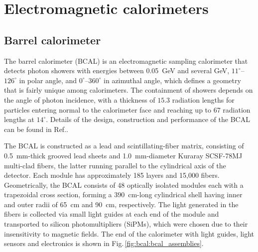 \section[Electromagnetic calorimeters] {Electromagnetic calorimeters \label{sec:calorimeters}}

\subsection[Barrel calorimeter ]{Barrel calorimeter \label{sec:bcal}}
The barrel calorimeter (BCAL) is an electromagnetic sampling calorimeter that detects photon showers with energies between 0.05~GeV and several GeV, $11^{\circ}$--$126^{\circ}$ in polar angle, and $0^{\circ}$--$360^{\circ}$ in azimuthal angle, which defines a geometry that is fairly unique among calorimeters. The containment of showers depends on the angle of photon incidence, with a thickness of $15.3$ radiation lengths for particles entering normal to the calorimeter face and reaching up to 67 radiation lengths at $14^{\circ}$. Details of the design, construction and performance of the BCAL can be found in Ref.\cite{BEATTIE201824}.

The BCAL is constructed as a lead and  scintillating-fiber matrix, consisting of 0.5~mm-thick grooved lead sheets and 1.0~mm-diameter Kuraray SCSF-78MJ multi-clad fibers, the latter running parallel to the cylindrical axis of the detector. Each module has approximately 185 layers and 15,000 fibers. Geometrically, the BCAL consists of 48 optically isolated modules each with a trapezoidal cross section, forming a  390~cm-long cylindrical shell having inner and outer radii of 65~cm and 90~cm, respectively. The light generated in the fibers is collected via small light guides at each end of the module and transported to silicon photomultipliers (SiPMs), which were chosen due to their insensitivity to magnetic fields. The end of the calorimeter with light guides, light sensors and electronics is shown in  Fig.\,\ref{fig:bcal:bcal_assemblies}.

